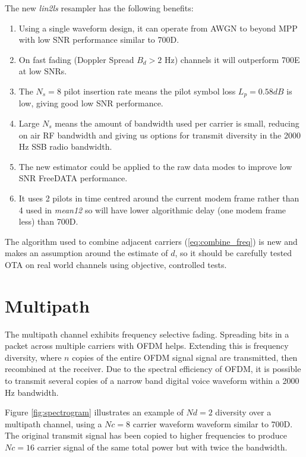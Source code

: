 \documentclass{article}
\begin{document}
The new \emph{lin2ls} resampler has the following benefits:
\begin{enumerate}
\item Using a single waveform design, it can operate from AWGN to beyond MPP with low SNR performance similar to 700D.
\item On fast fading (Doppler Spread $B_d>2$ Hz) channels it will outperform 700E at low SNRs.
\item The $N_s=8$ pilot insertion rate means the pilot symbol loss $L_p=0.58 \si{dB}$ is low, giving good low SNR performance.
\item Large $N_s$ means the amount of bandwidth used per carrier is small, reducing on air RF bandwidth and giving us options for transmit diversity in the 2000 Hz SSB radio bandwidth.
\item The new estimator could be applied to the raw data modes to improve low SNR FreeDATA performance.
\item It uses 2 pilots in time centred around the current modem frame rather than 4 used in \emph{mean12} so will have lower algorithmic delay (one modem frame less) than 700D.
\end{enumerate}	

The algorithm used to combine adjacent carriers (\ref{eq:combine_freq}) is new and makes an assumption around the estimate of $d$, so it should be carefully tested OTA on real world channels using objective, controlled tests.

\section{Multipath}

The multipath channel exhibits frequency selective fading.  Spreading bits in a packet across multiple carriers with OFDM helps.  Extending this is frequency diversity, where $n$ copies of the entire OFDM signal signal are transmitted, then recombined at the receiver.  Due to the spectral efficiency of OFDM, it is possible to transmit several copies of a narrow band digital voice waveform within a 2000 Hz bandwidth.

Figure \ref{fig:spectrogram} illustrates an example of $Nd=2$ diversity over a multipath channel, using a $Nc=8$ carrier waveform waveform similar to 700D.  The original transmit signal has been copied to higher frequencies to produce $Nc=16$ carrier signal of the same total power but with twice the bandwidth.
\end{document}
